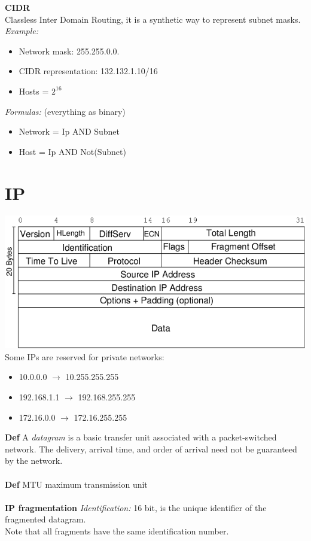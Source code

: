 \documentclass[10pt,a4paper]{book}
\begin{document}
\textbf{CIDR}\\
Classless Inter Domain Routing, it is a synthetic way to represent subnet masks.\\
\emph{Example: }
\begin{itemize}
\item Network mask: 255.255.0.0.
\item CIDR representation: 132.132.1.10/16
\item Hosts = $2^{16}$
\end{itemize}
\emph{Formulas:} (everything as binary)
\begin{itemize}
\item Network = Ip AND Subnet
\item Host = Ip AND Not(Subnet)
\end{itemize}
\newpage
\section{IP}
\includegraphics[scale=0.5]{ip.png}\\
Some IPs are reserved for private networks:
\begin{itemize}
\item 10.0.0.0 $\to$ 10.255.255.255
\item 192.168.1.1 $\to$ 192.168.255.255
\item 172.16.0.0 $\to$ 172.16.255.255
\end{itemize}
\textbf{Def} A \emph{datagram} is a basic transfer unit associated with a packet-switched network. The delivery, arrival time, and order of arrival need not be guaranteed by the network.\\\\
\textbf{Def} MTU maximum transmission unit\\\\
\textbf{IP fragmentation}
\emph{Identification:} 16 bit, is the unique identifier of the fragmented datagram.\\
Note that all fragments have the same identification number.\\
\end{document}
